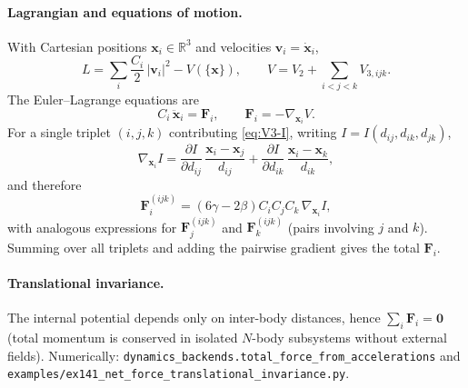 \paragraph{Lagrangian and equations of motion.}
With Cartesian positions $\mathbf{x}_i\in\mathbb{R}^3$ and velocities $\mathbf{v}_i=\dot{\mathbf{x}}_i$,
\begin{equation}
  L = \sum_i \frac{C_i}{2}\,|\mathbf{v}_i|^2 - V(\{\mathbf{x}\}),
  \qquad
  V = V_2 + \sum_{i<j<k} V_{3,ijk}.
\end{equation}
The Euler--Lagrange equations are
\begin{equation}
  C_i\,\ddot{\mathbf{x}}_i = \mathbf{F}_i,
  \qquad
  \mathbf{F}_i = -\nabla_{\mathbf{x}_i} V.
\end{equation}
For a single triplet $(i,j,k)$ contributing \eqref{eq:V3-I}, writing $I=I(d_{ij},d_{ik},d_{jk})$,
\begin{equation}
  \nabla_{\mathbf{x}_i} I
  = \frac{\partial I}{\partial d_{ij}}\,\frac{\mathbf{x}_i-\mathbf{x}_j}{d_{ij}}
  + \frac{\partial I}{\partial d_{ik}}\,\frac{\mathbf{x}_i-\mathbf{x}_k}{d_{ik}},
\end{equation}
and therefore
\begin{equation}
  \mathbf{F}_i^{(ijk)}
  = (6\gamma - 2\beta) C_i C_j C_k\,\nabla_{\mathbf{x}_i} I,
\end{equation}
with analogous expressions for $\mathbf{F}_j^{(ijk)}$ and $\mathbf{F}_k^{(ijk)}$ (pairs involving $j$ and $k$).  Summing over all triplets and adding the pairwise gradient gives the total $\mathbf{F}_i$.

\paragraph{Translational invariance.}
The internal potential depends only on inter-body distances, hence
$\sum_i \mathbf{F}_i=\mathbf{0}$ (total momentum is conserved in isolated $N$-body
subsystems without external fields).  Numerically:
\texttt{dynamics\_backends.total\_force\_from\_accelerations} and
\texttt{examples/ex141\_net\_force\_translational\_invariance.py}.

